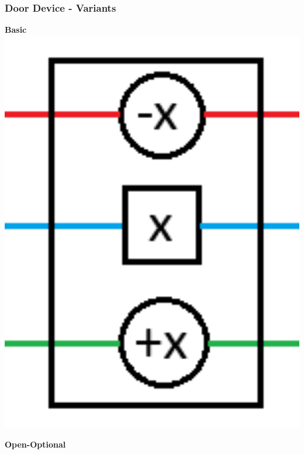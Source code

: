 \documentclass{beamer}
\begin{document}
\begin{frame}
  \frametitle{Door Device - Variants}
  \begin{minipage}[t]{0.32\textwidth}
    \textbf{Basic}
    \includegraphics[width=1\textwidth]{res/DoorNormal.png}
  \end{minipage}
  \begin{minipage}[t]{0.32\textwidth}
    \textbf{Open-Optional}

\end{minipage}
\end{frame}
\end{document}

